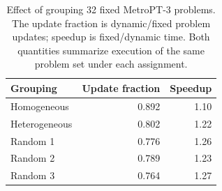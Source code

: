 \begin{table}[!t]
\centering
\caption{Effect of grouping 32 fixed MetroPT-3 problems. The update fraction is dynamic/fixed problem updates; speedup is fixed/dynamic time. Both quantities summarize execution of the same problem set under each assignment.}
\label{tab:metropt-grouping}
\small
\setlength{\tabcolsep}{5pt}
\renewcommand{\arraystretch}{1.15}
\begin{tabular}{@{}lrr@{}}
\toprule
Grouping & Update fraction & Speedup \\
\midrule
Homogeneous & 0.892 & 1.10 \\
Heterogeneous & 0.802 & 1.22 \\
Random 1 & 0.776 & 1.26 \\
Random 2 & 0.789 & 1.23 \\
Random 3 & 0.764 & 1.27 \\
\bottomrule
\end{tabular}
\end{table}
